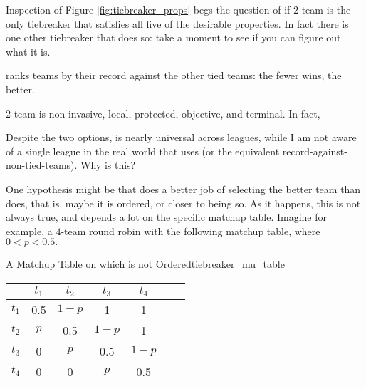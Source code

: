 {    Inspection of Figure \ref{fig:tiebreaker_props} begs the question of if $2$-team  is the only tiebreaker that satisfies all five of the desirable properties. In fact there is one other tiebreaker that does so: take a moment to see if you can figure out what it is.

    \begin{definition}{}{}
         ranks teams by their record against the other tied teams: the fewer wins, the better.
    \end{definition}

    $2$-team  is non-invasive, local, protected, objective, and terminal. In fact,



    Despite the two options,  is nearly universal across leagues, while I am not aware of a single league in the real world that uses  (or the equivalent record-against-non-tied-teams). Why is this?

    One hypothesis might be that  does a better job of selecting the better team than  does, that is, maybe it is ordered, or closer to being so. As it happens, this is not always true, and depends a lot on the specific matchup table. Imagine for example, a $4$-team round robin with the following matchup table, where $0 < p < 0.5.$


    \begin{figg}{A Matchup Table on which  is not Ordered}{tiebreaker_mu_table}
        \begin{center}
            \begin{tabular}{c | c c c c c c}
            & $t_1$ & $t_2$ & $t_3$ & $t_4$\\ 
            \hline
            $t_1$ & 0.5 & $1- p$ & 1 & 1 \\
            $t_2$ & $p$ & 0.5 & $1- p$ & 1 \\
            $t_3$ & 0 & $p$ & 0.5 & $1- p$ \\
            $t_4$ & 0 & 0 & $p$ & 0.5 \\
            \end{tabular}
        \end{center}
    \end{figg}

}
